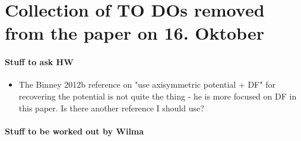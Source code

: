 \section{Collection of TO DOs removed from the paper on 16. Oktober}

\paragraph{Stuff to ask HW}
\begin{itemize}
\item The Binney 2012b reference on "use axisymmetric potential + DF" for recovering the potential is not quite the thing - he is more focused on DF in this paper. Is there another reference I should use?
\end{itemize}

\paragraph{Stuff to be worked out by Wilma}
